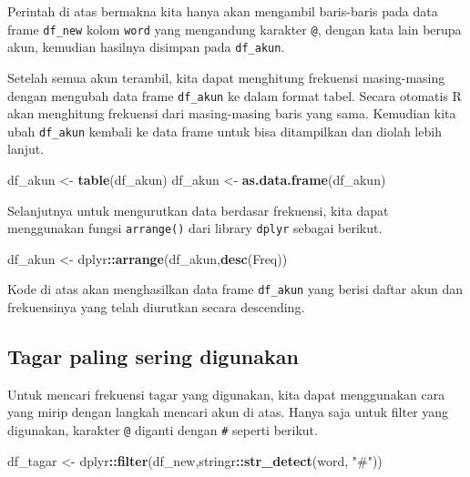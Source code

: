 \documentclass[]{book}
\newenvironment{Shaded}{\begin{snugshade}}{\end{snugshade}}
\newcommand{\KeywordTok}[1]{\textcolor[rgb]{0.13,0.29,0.53}{\textbf{#1}}}
\newcommand{\NormalTok}[1]{#1}
\newcommand{\OperatorTok}[1]{\textcolor[rgb]{0.81,0.36,0.00}{\textbf{#1}}}
\newcommand{\StringTok}[1]{\textcolor[rgb]{0.31,0.60,0.02}{#1}}
\begin{document}
Perintah di atas bermakna kita hanya akan mengambil baris-baris pada
data frame \texttt{df\_new} kolom \texttt{word} yang mengandung karakter
\texttt{@}, dengan kata lain berupa akun, kemudian hasilnya disimpan
pada \texttt{df\_akun}.

Setelah semua akun terambil, kita dapat menghitung frekuensi
masing-masing dengan mengubah data frame \texttt{df\_akun} ke dalam
format tabel. Secara otomatis R akan menghitung frekuensi dari
masing-masing baris yang sama. Kemudian kita ubah \texttt{df\_akun}
kembali ke data frame untuk bisa ditampilkan dan diolah lebih lanjut.

\begin{Shaded}
\begin{Highlighting}[]
\NormalTok{df_akun <-}\StringTok{ }\KeywordTok{table}\NormalTok{(df_akun)}
\NormalTok{df_akun <-}\StringTok{ }\KeywordTok{as.data.frame}\NormalTok{(df_akun)}
\end{Highlighting}
\end{Shaded}

Selanjutnya untuk mengurutkan data berdasar frekuensi, kita dapat
menggunakan fungsi \texttt{arrange()} dari library \texttt{dplyr}
sebagai berikut.

\begin{Shaded}
\begin{Highlighting}[]
\NormalTok{df_akun <-}\StringTok{ }\NormalTok{dplyr}\OperatorTok{::}\KeywordTok{arrange}\NormalTok{(df_akun,}\KeywordTok{desc}\NormalTok{(Freq))}
\end{Highlighting}
\end{Shaded}

Kode di atas akan menghasilkan data frame \texttt{df\_akun} yang berisi
daftar akun dan frekuensinya yang telah diurutkan secara descending.

\hypertarget{tagar-paling-sering-digunakan}{%
\subsection{Tagar paling sering
digunakan}\label{tagar-paling-sering-digunakan}}

Untuk mencari frekuensi tagar yang digunakan, kita dapat menggunakan
cara yang mirip dengan langkah mencari akun di atas. Hanya saja untuk
filter yang digunakan, karakter \texttt{@} diganti dengan \texttt{\#}
seperti berikut.

\begin{Shaded}
\begin{Highlighting}[]
\NormalTok{df_tagar <-}\StringTok{ }\NormalTok{dplyr}\OperatorTok{::}\KeywordTok{filter}\NormalTok{(df_new,stringr}\OperatorTok{::}\KeywordTok{str_detect}\NormalTok{(word, }\StringTok{"#"}\NormalTok{))}
\end{Highlighting}
\end{Shaded}
\end{document}
